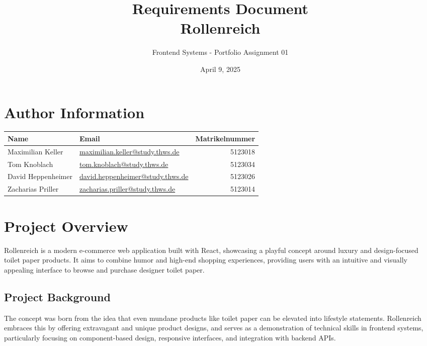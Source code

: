 \documentclass[a4paper,11pt]{article}
\title{\textbf{Requirements Document\\[0.5em]\Large Rollenreich}}
\author{Frontend Systems - Portfolio Assignment 01}
\date{April 9, 2025}
\begin{document}
\maketitle

\section*{Author Information}
\begin{tabularx}{\textwidth}{l X r}
\textbf{Name} & \textbf{Email} & \textbf{Matrikelnummer} \\
\hline
Maximilian Keller & \href{mailto:maximilian.keller@study.thws.de}{maximilian.keller@study.thws.de} & 5123018 \\
Tom Knoblach & \href{mailto:tom.knoblach@study.thws.de}{tom.knoblach@study.thws.de} & 5123034 \\
David Heppenheimer & \href{mailto:david.heppenheimer@study.thws.de}{david.heppenheimer@study.thws.de} & 5123026 \\
Zacharias Priller & \href{mailto:zacharias.priller@study.thws.de}{zacharias.priller@study.thws.de} & 5123014 \\
\end{tabularx}

\tableofcontents

\newpage

\section{Project Overview}
Rollenreich is a modern e-commerce web application built with React, showcasing a playful concept around luxury and design-focused toilet paper products. It aims to combine humor and high-end shopping experiences, providing users with an intuitive and visually appealing interface to browse and purchase designer toilet paper.

\subsection{Project Background}
The concept was born from the idea that even mundane products like toilet paper can be elevated into lifestyle statements. Rollenreich embraces this by offering extravagant and unique product designs, and serves as a demonstration of technical skills in frontend systems, particularly focusing on component-based design, responsive interfaces, and integration with backend APIs.
\end{document}
